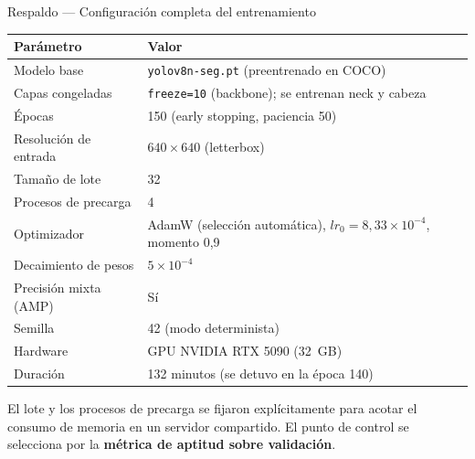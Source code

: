 \documentclass[aspectratio=169,11pt]{beamer}
\begin{document}
\begin{frame}{Respaldo --- Configuración completa del entrenamiento}
  \centering
  \small
  \begin{tabular}{@{}ll@{}}
    \toprule
    \textbf{Parámetro} & \textbf{Valor} \\
    \midrule
    Modelo base & \texttt{yolov8n-seg.pt} (preentrenado en COCO) \\
    Capas congeladas & \texttt{freeze=10} (backbone); se entrenan neck y cabeza \\
    Épocas & 150 (early stopping, paciencia 50) \\
    Resolución de entrada & $640\times640$ (letterbox) \\
    Tamaño de lote & 32 \\
    Procesos de precarga & 4 \\
    Optimizador & AdamW (selección automática), $lr_0 = 8{,}33\times10^{-4}$, momento 0,9 \\
    Decaimiento de pesos & $5\times10^{-4}$ \\
    Precisión mixta (AMP) & Sí \\
    Semilla & 42 (modo determinista) \\
    Hardware & GPU NVIDIA RTX 5090 (32~GB) \\
    Duración & 132 minutos (se detuvo en la época 140) \\
    \bottomrule
  \end{tabular}

  \vspace{0.8em}
  {\footnotesize El lote y los procesos de precarga se fijaron explícitamente para acotar
  el consumo de memoria en un servidor compartido. El punto de control se selecciona por
  la \textbf{métrica de aptitud sobre validación}.}
\end{frame}
\end{document}
